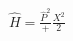 \documentclass[preview]{standalone}
\begin{document}
\begin{center}
$\hat{H} = \frac{\hat{P}^2} +\frac{X^2}{2}$
\end{center}
\end{document}
